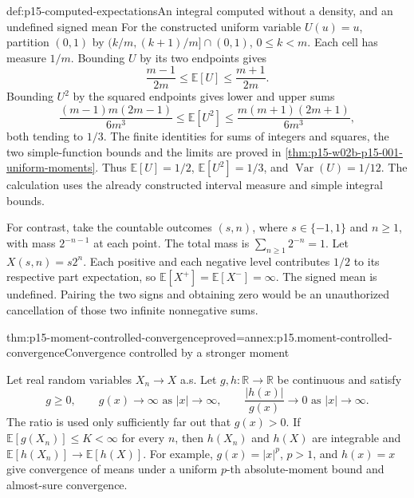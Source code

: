 \begin{hbexample}{def:p15-computed-expectations}{An integral computed without a density, and an undefined signed mean}
For the constructed uniform variable \(U(u)=u\), partition \((0,1)\)
by \((k/m,(k+1)/m]\cap(0,1)\), \(0\leq k<m\). Each cell has
measure \(1/m\). Bounding \(U\) by its two endpoints gives
\[
 \frac{m-1}{2m}\leq\mathbb E[U]\leq\frac{m+1}{2m}.
\]
Bounding \(U^2\) by the squared endpoints gives lower and upper sums
\[
 \frac{(m-1)m(2m-1)}{6m^3}
 \leq\mathbb E[U^2]\leq
 \frac{m(m+1)(2m+1)}{6m^3},
\]
both tending to \(1/3\).
The finite identities for sums of integers and squares, the two
simple-function bounds and the limits are proved in
\cref{thm:p15-w02b-p15-001-uniform-moments}.
Thus \(\mathbb E[U]=1/2\), \(\mathbb E[U^2]=1/3\), and
\(\operatorname{Var}(U)=1/12\). The calculation uses the already
constructed interval measure and simple integral bounds.

For contrast, take the countable outcomes \((s,n)\), where
\(s\in\{-1,1\}\) and \(n\geq1\), with mass \(2^{-n-1}\)
at each point. The total mass is \(\sum_{n\geq1}2^{-n}=1\).
Let \(X(s,n)=s2^n\). Each positive and each negative level contributes
\(1/2\) to its respective part expectation, so
\(\mathbb E[X^+]=\mathbb E[X^-]=\infty\). The signed mean is
undefined. Pairing the two signs and obtaining zero would be an
unauthorized cancellation of those two infinite nonnegative sums.
\end{hbexample}

\begin{hbtheorem}{thm:p15-moment-controlled-convergence}{proved=annex:p15.moment-controlled-convergence}{Convergence controlled by a stronger moment}
\par\nobreak
Let real random variables \(X_n\to X\) a.s. Let
\(g,h:\mathbb R\to\mathbb R\) be continuous and satisfy
\[
 g\geq0,\qquad g(x)\to\infty\text{ as }|x|\to\infty,\qquad
 \frac{|h(x)|}{g(x)}\to0\text{ as }|x|\to\infty.
\]
The ratio is used only sufficiently far out that \(g(x)>0\).
If \(\mathbb E[g(X_n)]\leq K<\infty\) for every \(n\), then
\(h(X_n)\) and \(h(X)\) are integrable and
\(\mathbb E[h(X_n)]\to\mathbb E[h(X)]\).
For example, \(g(x)=|x|^p\), \(p>1\), and \(h(x)=x\) give
convergence of means under a uniform \(p\)-th absolute-moment bound
and almost-sure convergence.
\end{hbtheorem}


